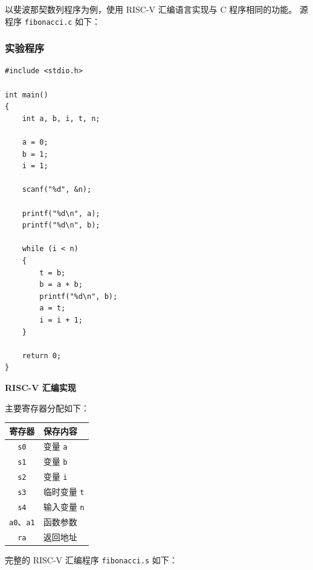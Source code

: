 \documentclass[UTF8,a4paper,10pt]{ctexart}
\begin{document}
以斐波那契数列程序为例，使用 RISC-V 汇编语言实现与 C 程序相同的功能。
源程序 \verb|fibonacci.c| 如下：

\subsubsection{实验程序}

\begin{verbatim}
#include <stdio.h>

int main()
{
    int a, b, i, t, n;

    a = 0;
    b = 1;
    i = 1;

    scanf("%d", &n);

    printf("%d\n", a);
    printf("%d\n", b);

    while (i < n)
    {
        t = b;
        b = a + b;
        printf("%d\n", b);
        a = t;
        i = i + 1;
    }

    return 0;
}
\end{verbatim}

\textbf{RISC-V 汇编实现}


主要寄存器分配如下：

\begin{center}
\begin{tabular}{cl}
    \toprule
    寄存器 & 保存内容 \\
    \midrule
    \verb|s0| & 变量 \verb|a| \\
    \verb|s1| & 变量 \verb|b| \\
    \verb|s2| & 变量 \verb|i| \\
    \verb|s3| & 临时变量 \verb|t| \\
    \verb|s4| & 输入变量 \verb|n| \\
    \verb|a0|、\verb|a1| & 函数参数 \\
    \verb|ra| & 返回地址 \\
    \bottomrule
\end{tabular}
\end{center}

完整的 RISC-V 汇编程序 \verb|fibonacci.s| 如下：
\end{document}
